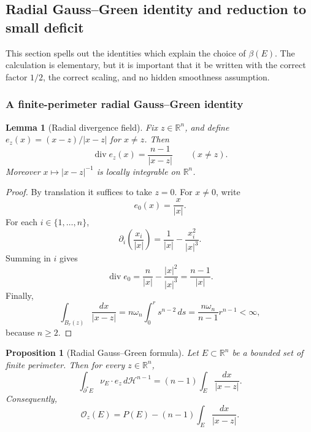 \documentclass[11pt]{amsart}
\newtheorem{proposition}[theorem]{Proposition}
\newtheorem{lemma}[theorem]{Lemma}
\theoremstyle{definition}
\newcommand{\R}{\mathbb R}
\newcommand{\Hn}{\mathcal H^{n-1}}
\newcommand{\Per}{P}
\newcommand{\osc}{\mathcal O}
\begin{document}
\subsection{Radial Gauss--Green identity and reduction to small deficit}\label{app-sec:identity}

This section spells out the identities which explain the choice of
\(\beta(E)\).  The calculation is elementary, but it is important that it be
written with the correct factor \(1/2\), the correct scaling, and no hidden
smoothness assumption.

\subsubsection{A finite-perimeter radial Gauss--Green identity}

\begin{lemma}[Radial divergence field]\label{lem:radial-div}
Fix \(z\in\R^n\), and define \(e_z(x)=(x-z)/|x-z|\) for \(x\ne z\).
Then
\[
   \operatorname{div}e_z(x)=\frac{n-1}{|x-z|}
   \qquad (x\ne z).
\tag{2.1}\label{eq:div-e}
\]
Moreover \(x\mapsto |x-z|^{-1}\) is locally integrable on \(\R^n\).
\end{lemma}

\begin{proof}
By translation it suffices to take \(z=0\).  For \(x\ne0\), write
\[
   e_0(x)=\frac{x}{|x|}.
\]
For each \(i\in\{1,\ldots,n\}\),
\[
   \partial_i\!\left(\frac{x_i}{|x|}\right)
   =\frac1{|x|}-\frac{x_i^2}{|x|^3}.
\]
Summing in \(i\) gives
\[
   \operatorname{div}e_0
   =\frac{n}{|x|}-\frac{|x|^2}{|x|^3}
   =\frac{n-1}{|x|}.
\]
Finally,
\[
   \int_{B_r(z)}\frac{dx}{|x-z|}
   =n\omega_n\int_0^r s^{n-2}\,ds
   =\frac{n\omega_n}{n-1}r^{n-1}<\infty,
\]
because \(n\ge2\).
\end{proof}

\begin{proposition}[Radial Gauss--Green formula]\label{prop:radial-GG}
Let \(E\subset\R^n\) be a bounded set of finite perimeter.  Then for every
\(z\in\R^n\),
\[
   \int_{\partial^*E}\nu_E\cdot e_z\,d\Hn
   =(n-1)\int_E\frac{dx}{|x-z|}.
\tag{2.2}\label{eq:radial-GG}
\]
Consequently,
\[
   \osc_z(E)
   =\Per(E)-(n-1)\int_E\frac{dx}{|x-z|}.
\tag{2.3}\label{eq:osc-potential}
\]
\end{proposition}
\end{document}
